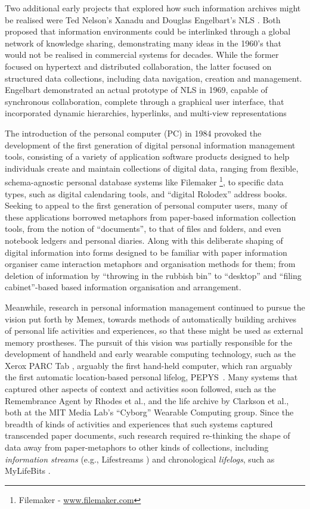 \documentclass[graybox]{svmult}
\begin{document}
Two additional early projects that explored how such information archives might be realised were Ted Nelson’s Xanadu \cite{nelson1987literary} and Douglas Engelbart's NLS \cite{engelbart1968research}.  Both proposed that information environments could be interlinked through a global network of knowledge sharing, demonstrating many ideas in the 1960’s that would not be realised in commercial systems for decades.  While the former focused on hypertext and distributed collaboration, the latter focused on structured data collections, including data navigation, creation and management.  Engelbart demonstrated an actual prototype of NLS in 1969, capable of synchronous collaboration, complete through a graphical user interface, that incorporated dynamic hierarchies, hyperlinks, and multi-view representations  

The introduction of the personal computer (PC) in 1984 provoked the development of the first generation of digital personal information management tools, consisting of a variety of application software products designed to help individuals create and maintain collections of digital data, ranging from flexible, schema-agnostic personal database systems like Filemaker \footnote{Filemaker - \url{www.filemaker.com}}, to specific data types, such as digital calendaring tools, and ``digital Rolodex'' address books.  Seeking to appeal to the first generation of personal computer users, many of these applications borrowed metaphors from paper-based information collection tools, from the notion of ``documents'', to that of files and folders, and even notebook ledgers and personal diaries. Along with this deliberate shaping of digital information into forms designed to be familiar with paper information organiser came interaction metaphors and organisation methods for them; from deletion of information by ``throwing in the rubbish bin'' to ``desktop'' and ``filing cabinet''-based based information organisation and arrangement.

Meanwhile, research in personal information management continued to pursue the vision put forth by Memex, towards methods of automatically building archives of personal life activities and experiences, so that these might be used as external memory prostheses.  The pursuit of this vision was partially responsible for the development of handheld and early wearable computing technology, such as the Xerox PARC Tab \cite{schilit1993parctab}, arguably the first hand-held computer, which ran arguably the first automatic location-based personal lifelog, PEPYS~\cite{newman1991pepys}.  Many systems that captured other aspects of context and activities soon followed, such as the Remembrance Agent by Rhodes et al., and the life archive by Clarkson et al., both at the MIT Media Lab's ``Cyborg'' Wearable Computing group. Since the breadth of kinds of activities and experiences that such systems captured transcended paper documents, such research required re-thinking the shape of data away from paper-metaphors to other kinds of collections, including \emph{information streams} (e.g., Lifestreams \cite{fertig1996lifestreams}) and chronological \emph{lifelogs}, such as MyLifeBits \cite{gemmell2002mylifebits}.
\end{document}
